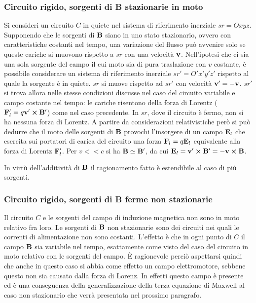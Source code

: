 \subsubsection{Circuito rigido, sorgenti di B stazionarie in moto}
Si consideri un circuito $C$ in quiete nel sistema di riferimento inerziale $sr=Oxyz$. Supponendo che le
sorgenti di $\vb{B}$ siano in uno stato stazionario, ovvero con caratteristiche costanti nel tempo,
una variazione del flusso può avvenire solo se queste cariche si muovono rispetto a $sr$ con una velocità $\vb{v}$.
Nell'ipotesi che ci sia una sola sorgente del campo il cui moto sia
di pura traslazione con $v$ costante, è possibile considerare un sistema di riferimento inerziale
$sr'=O'x'y'z'$ rispetto al quale la sorgente è in quiete. $sr$ si muove rispetto ad $sr'$ con
velocità $\vb{v}'=-\vb{v}$. $sr'$ si trova allora nelle stesse condizioni discusse nel caso del circuito variabile e
campo costante nel tempo: le cariche risentono della forza di Lorentz ($\vb{F}'_l=q\vb{v}'\cp\vb{B}'$) come nel caso precedente.
In $sr$, dove il circuito è fermo, non si ha nessuna forza di Lorentz. A partire da considerazioni relativistiche però si può dedurre che
il moto delle sorgenti di $\vb{B}$ provochi l'insorgere di un campo $\vb{E}_l$ che esercita sui
portatori di carica del circuito una forza $\vb{F}_l=q\vb{E}_l$ equivalente alla forza di Lorentz $\vb{F}'_l$.
Per $v<<c$ si ha $\vb{B}\simeq\vb{B}'$, da cui $\vb{E}_l=\vb{v}'\cp\vb{B}'=-\vb{v}\cp\vb{B}$.

In virtù dell'additività di $\vb{B}$ il ragionamento fatto è estendibile al caso di più sorgenti.



\subsubsection{Circuito rigido, sorgenti di B ferme non stazionarie}
Il circuito $C$ e le sorgenti del campo di induzione magnetica non sono in moto relativo fra loro.
Le sorgenti di $\vb{B}$ non stazionarie sono dei circuiti nei quali le correnti di alimentazione
non sono costanti. L'effetto è che in ogni punto di $C$ il campo $\vb{B}$ sia variabile nel tempo,
esattamente come visto del caso del circuito in moto relativo con le sorgenti del campo.
È ragionevole perciò aspettarsi quindi che anche in questo caso si abbia come effetto un campo elettromotore,
sebbene questo non sia causato dalla forza di Lorenz. In effetti questo campo è presente ed è una
conseguenza della generalizzazione della terza equazione di Maxwell al caso non stazionario che
verrà presentata nel prossimo paragrafo.
